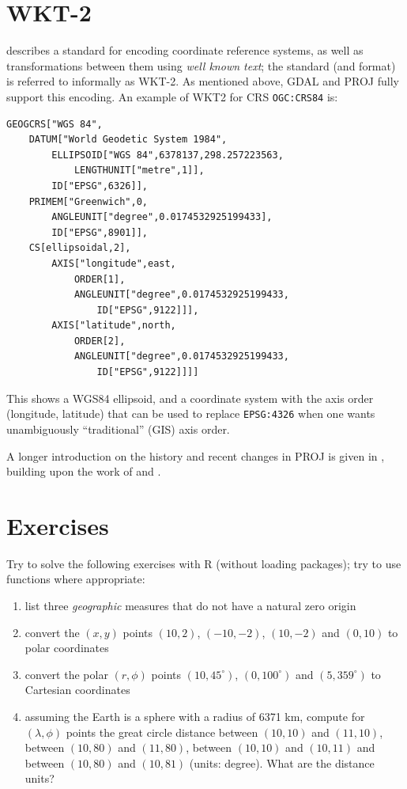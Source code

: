 \documentclass[]{book}
\providecommand{\tightlist}{%
  \setlength{\itemsep}{0pt}\setlength{\parskip}{0pt}}
\begin{document}
\hypertarget{wkt2}{%
\section{WKT-2}\label{wkt2}}

\citet{lott2015} describes a standard for encoding coordinate reference
systems, as well as transformations between them using \emph{well known
text}; the standard (and format) is referred to informally as
WKT-2. As mentioned above, GDAL and PROJ fully support this encoding.
An example of WKT2 for CRS \texttt{OGC:CRS84} is:

\begin{verbatim}
GEOGCRS["WGS 84",
    DATUM["World Geodetic System 1984",
        ELLIPSOID["WGS 84",6378137,298.257223563,
            LENGTHUNIT["metre",1]],
        ID["EPSG",6326]],
    PRIMEM["Greenwich",0,
        ANGLEUNIT["degree",0.0174532925199433],
        ID["EPSG",8901]],
    CS[ellipsoidal,2],
        AXIS["longitude",east,
            ORDER[1],
            ANGLEUNIT["degree",0.0174532925199433,
                ID["EPSG",9122]]],
        AXIS["latitude",north,
            ORDER[2],
            ANGLEUNIT["degree",0.0174532925199433,
                ID["EPSG",9122]]]]
\end{verbatim}

This shows a WGS84 ellipsoid, and a coordinate system with the axis
order (longitude, latitude) that can be used to replace \texttt{EPSG:4326}
when one wants unambiguously ``traditional'' (GIS) axis order.

A longer introduction on the history and recent changes in PROJ is
given in \citet{rogerCRS}, building upon the work of \citet{knudsen+evers17} and
\citet{evers+knudsen17}.

\hypertarget{exercises-1}{%
\section{Exercises}\label{exercises-1}}

Try to solve the following exercises with R (without loading packages); try to use functions where appropriate:

\begin{enumerate}
\def\labelenumi{\arabic{enumi}.}
\tightlist
\item
  list three \emph{geographic} measures that do not have a natural zero origin
\item
  convert the \((x,y)\) points \((10,2)\), \((-10,-2)\), \((10,-2)\) and \((0,10)\) to polar coordinates
\item
  convert the polar \((r,\phi)\) points \((10,45^{\circ})\), \((0,100^{\circ})\) and \((5,359^{\circ})\) to Cartesian coordinates
\item
  assuming the Earth is a sphere with a radius of 6371 km, compute for \((\lambda,\phi)\) points the great circle distance between \((10,10)\) and \((11,10)\), between \((10,80)\) and \((11,80)\), between \((10,10)\) and \((10,11)\) and between \((10,80)\) and \((10,81)\) (units: degree). What are the distance units?
\end{enumerate}
\end{document}
